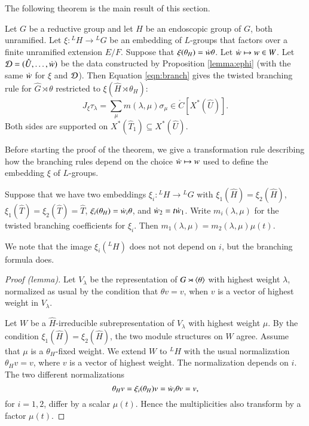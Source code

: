 The following theorem is the main result of this section.

\begin{theorem}\label{thm:branch}
  Let $G$ be a reductive group and let $H$ be an endoscopic group of
  $G$, both unramified.  Let $\xi:{}^LH\to {}^LG$ be an embedding of
  $L$-groups that factors over a finite unramified extension $E/F$.
  Suppose that $\xi(\theta_H) = \dot w\theta$.  Let $\dot w\mapsto w\in W$.
  Let $\mathcal D=(\hat U,\ldots,\dot w)$ be the data constructed by
  Proposition \ref{lemma:ephi} (with the same $\dot w$ for $\xi$ and $\mathcal D$).  
  Then Equation \ref{eqn:branch} gives
  the twisted branching rule for $\hat G\rtimes \theta$ restricted to
  $\xi(\hat H\rtimes \theta_H)$:
\[
J_\xi \tau_\lambda = \sum_\mu m(\lambda,\mu) \sigma_\mu \in
\ring{C}[X^*(\hat U)].
\]
Both sides are supported on $X^*(\hat T_1)\subseteq X^*(\hat U)$.
\end{theorem}

Before starting the proof of the theorem, we give a transformation
rule describing how the branching rules depend on the choice
$\dot w\mapsto w$ used to define the embedding $\xi$ of $L$-groups.

\begin{lemma}\label{lemma:transform}
  Suppose that we have two embeddings $\xi_i:{}^LH\to {}^LG$ with
  $\xi_1(\hat H) =\xi_2(\hat H)$, $\xi_1(\hat T) = \xi_2(\hat T) =
  \hat T$, $\xi_i(\theta_H) = \dot w_i\theta$, and $\dot w_2 =
  t\dot w_1$.  Write $m_i(\lambda,\mu)$ for the twisted branching
  coefficients for $\xi_i$.  Then $m_1(\lambda,\mu) =
  m_2(\lambda,\mu)\mu(t)$.
\end{lemma}

We note that the image $\xi_i({}^LH)$ does not not depend on $i$, but
the branching formula does.

\begin{proof}[Proof (lemma)]  
  Let $V_\lambda$ be the representation of $G\rtimes \langle{\theta}\rangle$
  with highest weight $\lambda$, normalized as usual by the condition
  that $\theta v=v$, when $v$ is a vector of highest weight in
  $V_\lambda$.

  Let $W$ be a $\hat H$-irreducible subrepresentation of $V_\lambda$
  with highest weight $\mu$.  By the condition $\xi_1(\hat H)
  =\xi_2(\hat H)$, the two module structures on $W$ agree.  Assume
  that $\mu$ is a $\theta_H$-fixed weight.  We extend $W$ to ${}^LH$
  with the usual normalization $\theta_H v = v$, where $v$ is a vector
  of highest weight.  The normalization depends on $i$.  The two
  different normalizations
\[
\theta_H v = \xi_i(\theta_H) v = \dot w_i \theta v =v,
\]
for $i=1,2$, 
differ by a scalar $\mu(t)$.  
Hence the multiplicities also transform by a factor $\mu(t)$.
\end{proof}

